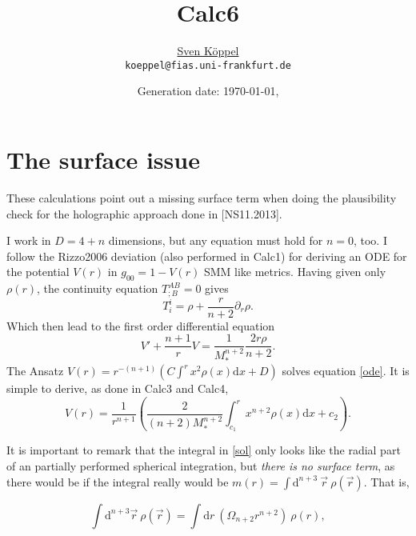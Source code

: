 \documentclass[10pt,a4paper, fleqn]{article}
\title{\vspace{-9ex} Calc6 \vspace{-1ex}} %
\author{\small %
\href{https://itp.uni-frankfurt.de/~koeppel}{Sven Köppel} \\
\small \texttt{koeppel@fias.uni-frankfurt.de}}
\date{\small Generation date: \today, \currenttime}
\begin{document}
\maketitle

\renewcommand{\d}{\mathrm{d}}
\newcommand{\dd}[2]{\frac{\mathrm{d} #1}{\mathrm{d} #2}}
\renewcommand{\L}{L_P}
\newcommand{\pr}{p_r}
\newcommand{\psenk}{p_\perp}
\newcommand{\ebenso}{\biggl( ~ \therefore ~ \biggr) }
\newcommand{\metrik}[1]{\d s^2 = \left( #1 \right) \d t^2 \left( #1 \right)^{-1} \d r^2 + r^2 \d \Omega_{D-2}^2 }
\newcommand{\winkel}{r^2 \d \Omega^2}
\newcommand{\dann}{$\rightarrow~$}

\section{The surface issue}
These calculations point out a missing surface term when doing the plausibility check for the holographic approach done in [NS11.2013].

I work in $D=4+n$ dimensions, but any equation must hold for $n=0$, too. I follow the Rizzo2006 deviation (also performed in Calc1) for deriving an ODE for the potential $V(r)$ in $g_{00}=1-V(r)$ SMM like metrics. Having given only $\rho(r)$, the continuity equation $T^{AB}_{;B}=0$ gives
\begin{equation}
T_i^i = \rho + \frac{r}{n+2} \partial_r \rho.
\end{equation}
Which then lead to the first order differential equation
\begin{equation}
V' + \frac{n+1}{r} V = \frac{1}{M_*^{n+2}} \frac{2r\rho}{n+2}. \label{ode}
\end{equation}
The Ansatz $V(r)=r^{-(n+1)}\left( C \int^r x^2 \rho(x) \d x + D\right)$ solves equation \ref{ode}. It is simple to derive, as done in Calc3 and Calc4,
\begin{equation}
V(r) = \frac{1}{r^{n+1}} \left( \frac{2}{(n+2)M_*^{n+2}} \int_{c_1}^r x^{n+2} \rho(x) \d x + c_2 \right). \label{sol}
\end{equation}

It is important to remark that the integral in \ref{sol} only looks like the radial part of an partially performed spherical integration, but {\it there is no surface term}, as there would be if the integral really would be $m(r)=\int \d^{n+3}~ \vec{r} ~\rho(\vec r)$. That is,

\begin{equation}
\int \d^{n+3} \vec{r} ~\rho(\vec{r}) = \int \d r ~\left( \Omega_{n+2} r^{n+2} \right)~ \rho(r), \label{reg}
\end{equation}
\end{document}
